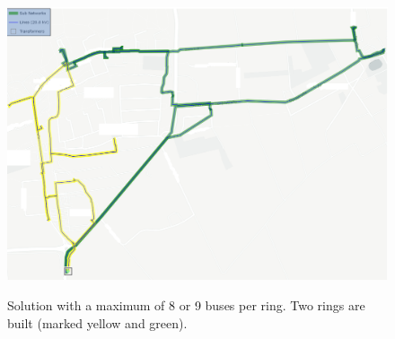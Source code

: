 \begin{figure}[h]
	\begin{centering}
		{\includegraphics[scale=0.3]{figures/experiments/ringsize/ringsize89_2.png}}
		\caption{Solution with a maximum of 8 or 9 buses per ring. Two rings are built (marked yellow and green).}
		\label{fig:ringsize89_2}
	\end{centering}
\end{figure}
